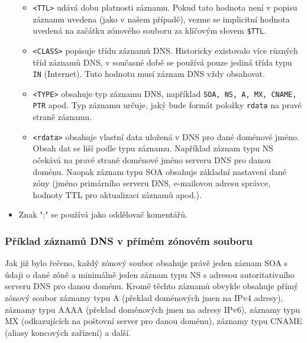 \begin{itemize}
\begin{itemize}
    \item \verb|<TTL>| udává dobu platnosti záznamu. Pokud tato hodnota není v popisu záznamu uvedena (jako v našem případě), vezme se implicitní hodnota uvedená na začátku zónového souboru za klíčovým slovem {\tt \$TTL}.
    \item \verb|<CLASS>| popisuje třídu záznamů DNS. Historicky existovalo více různých tříd záznamů DNS, v současné době se používá pouze jediná třída typu {\tt IN} (Internet). Tuto hodnotu musí záznam DNS vždy obsahovat.
    \item \verb|<TYPE>| obsahuje typ záznamu DNS, například {\tt SOA, NS, A, MX, CNAME, PTR} apod. Typ záznamu určuje, jaký bude formát položky {\tt rdata} na pravé straně záznamu.
    \item \verb|<rdata>| obsahuje vlastní data uložená v DNS pro dané doménové jméno. Obsah dat se liší podle typu záznamu. Například záznam typu NS očekává na pravé straně doménové jméno serveru DNS pro danou doménu. Naopak záznam typu SOA obsahuje základní nastavení dané zóny (jméno primárního serveru DNS, e-mailovou adresu správce, hodnoty TTL pro aktualizaci záznamů apod.).
  \end{itemize}
  \item Znak ";" se používá jako oddělovač komentářů.
\end{itemize}

\subsubsection{Příklad záznamů DNS v přímém zónovém souboru}
Jak již bylo řečeno, každý zónový soubor obsahuje právě jeden záznam SOA s údaji o dané zóně a minimálně jeden záznam typu NS s adresou autoritativního serveru DNS pro danou doménu. Kromě těchto záznamů obvykle obsahuje přímý zónový soubor záznamy typu A (překlad doménových jmen na IPv4 adresy), záznamy typu AAAA (překlad doménových jmen na adresy IPv6), záznamy typu MX (odkazujících na poštovní server pro danou doménu), záznamy typu CNAME (aliasy koncových zařízení) a další. 

